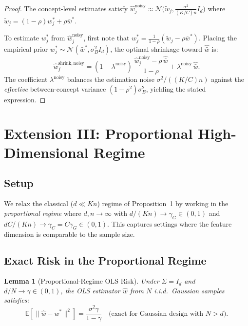 \documentclass[11pt,a4paper]{article}
\newtheorem{lemma}[theorem]{Lemma}
\newcommand{\E}{\mathbb{E}}
\newcommand{\what}{\hat{w}}
\newcommand{\wbar}{\bar{w}}
\newcommand{\Id}{I_d}
\begin{document}
\begin{proof}
The concept-level estimates satisfy $\what_j^{\mathrm{noisy}} \approx \mathcal{N}\bigl(\widetilde{w}_j, \frac{\sigma^2}{(K/C)n}\Id\bigr)$ where $\widetilde{w}_j = (1-\rho)w_j^* + \rho \wbar^*$.

To estimate $w_j^*$ from $\what_j^{\mathrm{noisy}}$, first note that $w_j^* = \frac{1}{1-\rho}(\widetilde{w}_j - \rho \wbar^*)$. Placing the empirical prior $w_j^* \sim \mathcal{N}(\wbar^*, \sigma_B^2 \Id)$, the optimal shrinkage toward $\hat{\bar{w}}$ is:
\[
\what_j^{\mathrm{shrink,noisy}} = (1 - \lambda^{\mathrm{noisy}})\, \frac{\what_j^{\mathrm{noisy}} - \rho\, \hat{\bar{w}}}{1 - \rho} + \lambda^{\mathrm{noisy}}\, \hat{\bar{w}}.
\]
The coefficient $\lambda^{\mathrm{noisy}}$ balances the estimation noise $\sigma^2/((K/C)n)$ against the \emph{effective} between-concept variance $(1-\rho^2)\sigma_B^2$, yielding the stated expression.
\end{proof}


\section{Extension III: Proportional High-Dimensional Regime}

\subsection{Setup}

We relax the classical ($d \ll Kn$) regime of Proposition~1 by working in the \emph{proportional regime} where $d, n \to \infty$ with $d / (Kn) \to \gamma_G \in (0, 1)$ and $dC/(Kn) \to \gamma_C = C \gamma_G \in (0, 1)$. This captures settings where the feature dimension is comparable to the sample size.

\subsection{Exact Risk in the Proportional Regime}

\begin{lemma}[Proportional-Regime OLS Risk]\label{lem:prop-risk}
Under $\Sigma = \Id$ and $d/N \to \gamma \in (0, 1)$, the OLS estimator $\what$ from $N$ i.i.d.\ Gaussian samples satisfies:
\begin{equation}\label{eq:prop-variance}
\E[\|\what - w^*\|^2] = \frac{\sigma^2 \gamma}{1 - \gamma} \quad \text{(exact for Gaussian design with } N > d\text{)}.
\end{equation}
\end{lemma}
\end{document}
